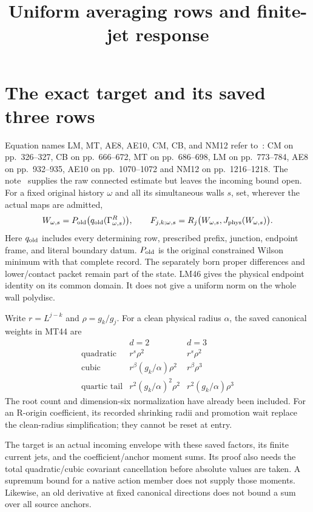 \documentclass[11pt,letterpaper]{article}
\title{Uniform averaging rows and finite-jet response}\author{}\date{}
\theoremstyle{plain}
\theoremstyle{remark}\newtheorem{remark}[theorem]{Scope}
\begin{document}
\maketitle
\section{The exact target and its saved three rows}

Equation names LM, MT, AE8, AE10, CM, CB, and NM12 refer to~\cite{W}: CM on pp.~326--327, CB on pp.~666--672, MT on pp.~686--698, LM on pp.~773--784, AE8 on pp.~932--935, AE10 on pp.~1070--1072 and NM12 on pp.~1216--1218. The note~\cite[\S3]{CE} supplies the raw connected
estimate but leaves the incoming bound open. For a fixed original history
$\omega$ and all its simultaneous walls $s$, set, wherever the actual maps
are admitted,
\begin{equation}
 W_{\omega,s}=P_{\rm old}\bigl(q_{\rm old}(\Gamma^R_{\omega,s})\bigr),
 \qquad
 F_{j,k;\omega,s}
 =R_j\bigl(W_{\omega,s},J_{\rm phys}(W_{\omega,s})\bigr).
 \label{eq:actual}
\end{equation}
Here $q_{\rm old}$ includes every determining row, prescribed prefix,
junction, endpoint frame, and literal boundary datum. $P_{\rm old}$ is the
original constrained Wilson minimum with that complete record. The separately
born proper differences and lower/contact packet remain part of the state.
LM46 gives the physical endpoint identity on its common domain. It does not
give a uniform norm on the whole wall polydisc.

Write $r=L^{j-k}$ and $\rho=g_k/g_j$. For a clean physical radius $\alpha$,
the saved canonical weights in MT44 are
\begin{equation}
\begin{array}{c|cc}
 & d=2&d=3\\ \hline
\text{quadratic}&r^s\rho^2&r^s\rho^2\\[2pt]
\text{cubic}&r^\beta(g_k/\alpha)\rho^2&r^\beta\rho^3\\[2pt]
\text{quartic tail}&r^2(g_k/\alpha)^2\rho^2&r^2(g_k/\alpha)\rho^3
\end{array}
\label{eq:weights}
\end{equation}
The root count and dimension-six normalization have already been included.
For an R-origin coefficient, its recorded shrinking radii and promotion wait
replace the clean-radius simplification; they cannot be reset at entry.

The target is an actual incoming envelope with these saved factors, its
finite current jets, and the coefficient/anchor moment sums. Its proof also
needs the total quadratic/cubic covariant cancellation before absolute values
are taken. A supremum bound for a native action member does not supply those
moments. Likewise, an old derivative at fixed canonical directions does not
bound a sum over all source anchors.
\end{document}
